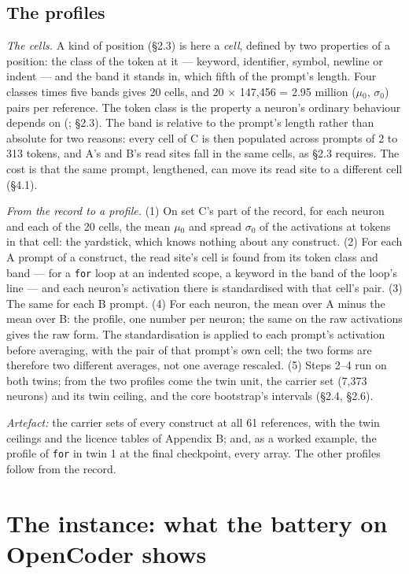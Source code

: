 \documentclass{article}
\begin{document}
\subsection{The profiles}

\emph{The cells.} A kind of position (\S2.3) is here a \emph{cell}, defined by two properties of a position: the class of the token at it --- keyword, identifier, symbol, newline or indent --- and the band it stands in, which fifth of the prompt's length. Four classes times five bands gives 20 cells, and 20 $\times$ 147,456 = 2.95 million ($\mu$$_0$, $\sigma$$_0$) pairs per reference. The token class is the property a neuron's ordinary behaviour depends on (\citealp{voita2024}; \S2.3). The band is relative to the prompt's length rather than absolute for two reasons: every cell of C is then populated across prompts of 2 to 313 tokens, and A's and B's read sites fall in the same cells, as \S2.3 requires. The cost is that the same prompt, lengthened, can move its read site to a different cell (\S4.1).

\emph{From the record to a profile.} (1) On set C's part of the record, for each neuron and each of the 20 cells, the mean $\mu$$_0$ and spread $\sigma$$_0$ of the activations at tokens in that cell: the yardstick, which knows nothing about any construct. (2) For each A prompt of a construct, the read site's cell is found from its token class and band --- for a \texttt{for} loop at an indented scope, a keyword in the band of the loop's line --- and each neuron's activation there is standardised with that cell's pair. (3) The same for each B prompt. (4) For each neuron, the mean over A minus the mean over B: the profile, one number per neuron; the same on the raw activations gives the raw form. The standardisation is applied to each prompt's activation before averaging, with the pair of that prompt's own cell; the two forms are therefore two different averages, not one average rescaled. (5) Steps 2--4 run on both twins; from the two profiles come the twin unit, the carrier set (7,373 neurons) and its twin ceiling, and the core bootstrap's intervals (\S2.4, \S2.6).

\emph{Artefact:} the carrier sets of every construct at all 61 references, with the twin ceilings and the licence tables of Appendix B; and, as a worked example, the profile of \texttt{for} in twin 1 at the final checkpoint, every array. The other profiles follow from the record.

\section{The instance: what the battery on OpenCoder shows}
\end{document}
